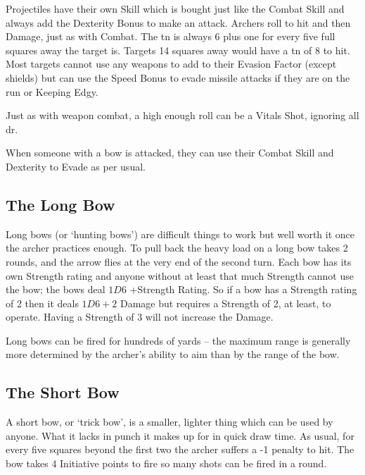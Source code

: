 \documentclass[titlepage,a4paper,openany]{book}
\begin{document}
\begin{multicols}{2}

Projectiles have their own Skill which is bought just like the Combat Skill and always add the Dexterity Bonus to make an attack. Archers roll to hit and then Damage, just as with Combat. The \gls{tn} is always 6 plus one for every five full squares away the target is. Targets 14 squares away would have a \gls{tn} of 8 to hit. Most targets cannot use any weapons to add to their Evasion Factor (except shields) but can use the Speed Bonus to evade missile attacks if they are on the run or Keeping Edgy.

Just as with weapon combat, a high enough roll can be a Vitals Shot, ignoring all \gls{dr}.

When someone with a bow is attacked, they can use their Combat Skill and Dexterity to Evade as per usual.

\subsection{The Long Bow}

Long bows (or `hunting bows') are difficult things to work but well worth it once the archer practices enough. To pull back the heavy load on a long bow takes 2 \glspl{round}, and the arrow flies at the very end of the second turn. Each bow has its own Strength rating and anyone without at least that much Strength cannot use the bow; the bows deal $1D6$ +Strength Rating. So if a bow has a Strength rating of 2 then it deals $1D6+2$ Damage but requires a Strength of 2, at least, to operate. Having a Strength of 3 will not increase the Damage.

Long bows can be fired for hundreds of yards -- the maximum range is generally more determined by the archer's ability to aim than by the range of the bow.

\subsection{The Short Bow}

A short bow, or `trick bow', is a smaller, lighter thing which can be used by anyone. What it lacks in punch it makes up for in quick draw time. As usual, for every five squares beyond the first two the archer suffers a -1 penalty to hit. The bow takes 4 Initiative points to fire so many shots can be fired in a \gls{round}.


\end{multicols}
\end{document}
